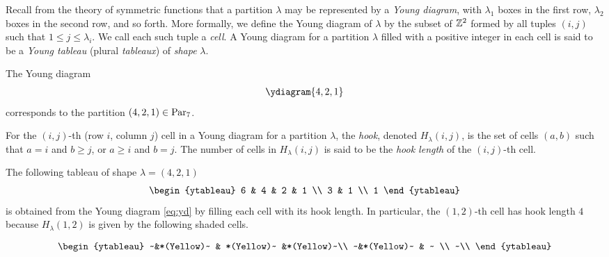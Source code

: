\documentclass[11pt]{amsart}
\begin{document}
Recall from the theory of symmetric functions that a partition $\lambda$ may be represented by a \emph{Young diagram}, with $\lambda_1$ boxes in the first row, $\lambda_2$ boxes in the second row, and so forth. More formally, we define the Young diagram of \(\lambda\) by the subset of \(\mathbb{Z}^2\) formed by all tuples \((i,j)\) such that \(1 \leq j \leq \lambda_i\). We call each such tuple a \emph{cell}. A Young diagram for a partition $\lambda$ filled with a positive integer in each cell is said to be a \emph{Young tableau} (plural \textit{tableaux}) of \emph{shape} $\lambda$. 
\begin{eg}
    The Young diagram
    \begin{align}
        \ydiagram{4, 2, 1} \label{eq:yd}
    \end{align}
    corresponds to the partition $(4, 2, 1) \in \mathrm{Par}_7$.
\end{eg}

\begin{defin}\label{def:hl}
    For the $(i, j)$-th (row $i$, column $j$) cell in a Young diagram for a partition $\lambda$, the \emph{hook}, denoted $H_\lambda(i, j)$, is the set of cells $(a, b)$ such that $a=i$ and $b\geq j$, or $a \geq i$ and $b =j$. The number of cells in $H_\lambda(i, j)$ is said to be the \emph{hook length} of the $(i, j)$-th cell. 
\end{defin}

\begin{eg}
The following tableau of shape $\lambda=(4, 2, 1)$
\begin{align*}
    \begin{ytableau}
        6 & 4 & 2 & 1 \\
        3 & 1 \\
        1
    \end{ytableau}
\end{align*}
is obtained from the Young diagram \cref{eq:yd} by filling each cell with its hook length. In particular, the $(1, 2)$-th cell has hook length $4$ because $H_\lambda(1,2)$ is given by the following shaded cells.

\begin{align*}
    \begin{ytableau}
    ~&*(Yellow)~ & *(Yellow)~ &*(Yellow)~\\
    ~&*(Yellow)~ & ~ \\
    ~\\
    \end{ytableau}
\end{align*}
\end{eg}
\end{document}
